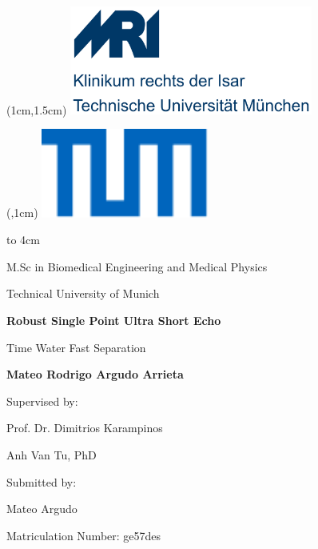 \begin{titlepage}

	\begin{textblock*}{8cm}(1cm,1.5cm) %
    	\includegraphics[width=8cm]{gfx/tum-resources/images/MRI.png}
	\end{textblock*}
	\begin{textblock*}{5.5cm}(\dimexpr\paperwidth-9cm,1cm) %
    	\includegraphics[width=5.5cm]{gfx/tum-resources/images/Universitaet_Logo_RGB.pdf}
	\end{textblock*}	
    \vbox to 4cm{}
    
    {\large M.Sc in Biomedical Engineering and Medical Physics
    \par Technical University of Munich\par}
    \vspace{1cm}
    
    {\LARGE\bfseries Robust Single Point Ultra Short Echo \par Time Water Fast Separation\par}
    \vspace{1cm}
    {\textcolor{TUMBlau}{\textbf{Mateo Rodrigo Argudo Arrieta}}\par}
    \vspace{3cm}
    
    Supervised by: \par
    {Prof. Dr. Dimitrios Karampinos\par
    \par Anh Van Tu, PhD\par}
    \vspace{1cm}
    
    Submitted by: \par
    \par Mateo Argudo \par
    \par Matriculation Number: ge57des \par
    \vspace{1cm}
    

\end{titlepage}

